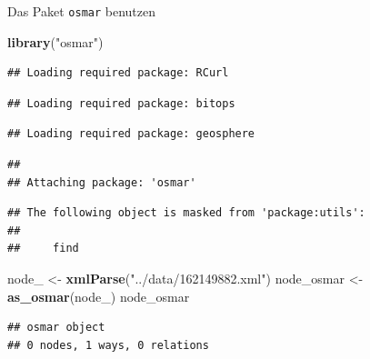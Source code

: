 \documentclass[ignorenonframetext,]{beamer}
\newenvironment{Shaded}{\begin{snugshade}}{\end{snugshade}}
\newcommand{\KeywordTok}[1]{\textcolor[rgb]{0.26,0.66,0.93}{\textbf{#1}}}
\newcommand{\NormalTok}[1]{\textcolor[rgb]{0.74,0.68,0.62}{#1}}
\newcommand{\StringTok}[1]{\textcolor[rgb]{0.02,0.61,0.04}{#1}}
\begin{document}
\begin{frame}[fragile]{Das Paket \texttt{osmar} benutzen}
\protect\hypertarget{das-paket-osmar-benutzen}{}

\begin{Shaded}
\begin{Highlighting}[]
\KeywordTok{library}\NormalTok{(}\StringTok{"osmar"}\NormalTok{)}
\end{Highlighting}
\end{Shaded}

\begin{verbatim}
## Loading required package: RCurl
\end{verbatim}

\begin{verbatim}
## Loading required package: bitops
\end{verbatim}

\begin{verbatim}
## Loading required package: geosphere
\end{verbatim}

\begin{verbatim}
## 
## Attaching package: 'osmar'
\end{verbatim}

\begin{verbatim}
## The following object is masked from 'package:utils':
## 
##     find
\end{verbatim}

\begin{Shaded}
\begin{Highlighting}[]
\NormalTok{node_ <-}\StringTok{ }\KeywordTok{xmlParse}\NormalTok{(}\StringTok{"../data/162149882.xml"}\NormalTok{)}
\NormalTok{node_osmar <-}\StringTok{ }\KeywordTok{as_osmar}\NormalTok{(node_)}
\NormalTok{node_osmar}
\end{Highlighting}
\end{Shaded}

\begin{verbatim}
## osmar object
## 0 nodes, 1 ways, 0 relations
\end{verbatim}

\end{frame}
\end{document}
